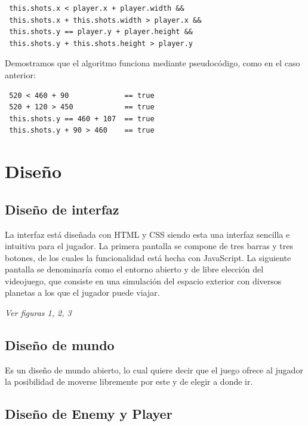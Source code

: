 \documentclass[a4paper,10pt]{article}
\begin{document}
\begin{verbatim}
 this.shots.x < player.x + player.width &&
 this.shots.x + this.shots.width > player.x &&
 this.shots.y == player.y + player.height &&
 this.shots.y + this.shots.height > player.y
\end{verbatim}

Demostramos que el algoritmo funciona mediante pseudocódigo, como en el caso anterior:

\begin{verbatim}
 520 < 460 + 90             == true
 520 + 120 > 450            == true
 this.shots.y == 460 + 107  == true
 this.shots.y + 90 > 460    == true
\end{verbatim}
\cleardoublepage









\section{Diseño}

\subsection{Diseño de interfaz}

La interfaz está diseñada con HTML y CSS siendo esta una interfaz 
sencilla e intuitiva para el jugador.
La primera pantalla se compone de tres barras y tres botones, de 
los cuales la funcionalidad está hecha con JavaScript.
La siguiente pantalla se denominaría como el entorno abierto y 
de libre elección del videojuego, que consiste en una simulación del 
espacio exterior con diversos planetas a los que el jugador puede viajar.

\emph{Ver figuras 1, 2, 3}

\subsection{Diseño de mundo}

Es un diseño de mundo abierto, lo cual quiere decir que el 
juego ofrece al jugador la posibilidad de moverse libremente por 
este y de elegir a donde ir.

\subsection{Diseño de Enemy y Player}
\end{document}
